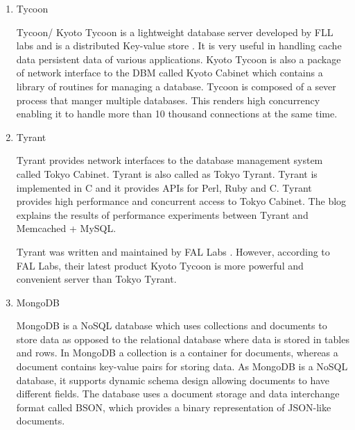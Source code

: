 \begin{enumerate}
\item {} 
Tycoon

Tycoon/ Kyoto Tycoon \label{\detokenize{i524/technologies:id413}}{\hyperref[\detokenize{i524/technologies:www-fallabs-tycoon}]{\sphinxcrossref{{[}352{]}}}} is a lightweight
database server developed by FLL labs and is a distributed
Key-value store \label{\detokenize{i524/technologies:id414}}{\hyperref[\detokenize{i524/technologies:www-cloufare-tycoon}]{\sphinxcrossref{{[}353{]}}}}. It is very useful in
handling cache data persistent data of various
applications. Kyoto Tycoon is also a package of network interface
to the DBM called Kyoto Cabinet \label{\detokenize{i524/technologies:id415}}{\hyperref[\detokenize{i524/technologies:www-fallabs-kyoto}]{\sphinxcrossref{{[}354{]}}}} which
contains a library of routines for managing a database. Tycoon is
composed of a sever process that manger multiple databases. This
renders high concurrency enabling it to handle more than 10
thousand connections at the same time.

\item {} 
Tyrant

Tyrant provides network interfaces to the database management
system called Tokyo Cabinet. Tyrant is also called as Tokyo
Tyrant. Tyrant is implemented in C and it provides APIs for Perl,
Ruby and C. Tyrant provides high performance and concurrent
access to Tokyo Cabinet. The blog \label{\detokenize{i524/technologies:id416}}{\hyperref[\detokenize{i524/technologies:www-tyrant-blog}]{\sphinxcrossref{{[}355{]}}}}
explains the results of performance experiments between Tyrant and
Memcached + MySQL.

Tyrant was written and maintained by FAL Labs
\label{\detokenize{i524/technologies:id417}}{\hyperref[\detokenize{i524/technologies:www-tyrant-fal-labs}]{\sphinxcrossref{{[}356{]}}}}.  However, according to FAL Labs,
their latest product \label{\detokenize{i524/technologies:id418}}{\hyperref[\detokenize{i524/technologies:www-kyoto-tycoon}]{\sphinxcrossref{{[}357{]}}}} Kyoto Tycoon is
more powerful and convenient server than Tokyo Tyrant.

\item {} 
MongoDB

MongoDB is a NoSQL database which uses collections and documents
to store data as opposed to the relational database where data is
stored in tables and rows. In MongoDB a collection is a container
for documents, whereas a document contains key-value pairs for
storing data. As MongoDB is a NoSQL database, it supports dynamic
schema design allowing documents to have different fields. The
database uses a document storage and data interchange format
called BSON, which provides a binary representation of JSON-like
documents.


\end{enumerate}
